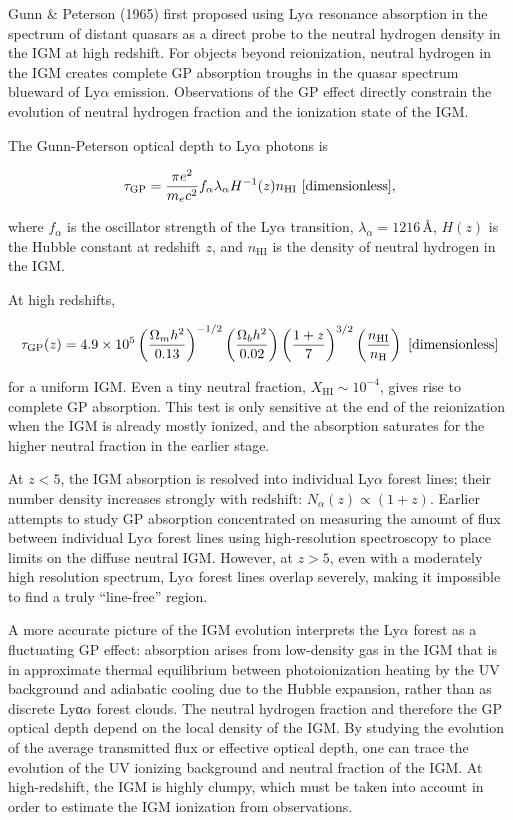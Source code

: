 \documentclass[a4paper,11pt]{article}
\begin{document}
{\noindent}Gunn \& Peterson (1965) first proposed using Ly$\alpha$ resonance absorption in the spectrum of distant quasars as a direct probe to the neutral hydrogen density in the IGM at high redshift. For objects beyond reionization, neutral hydrogen in the IGM creates complete GP absorption troughs in the quasar spectrum blueward of Ly$\alpha$ emission. Observations of the GP effect directly constrain the evolution of neutral hydrogen fraction and the ionization state of the IGM.

{\noindent}The Gunn-Peterson optical depth to Ly$\alpha$ photons is

\begin{align*}
    \tau_\mathrm{GP} = \frac{\pi e^2}{m_ec^2}f_\alpha\lambda_\alpha H^{-1}(z)n_\mathrm{HI} ~ [{\rm dimensionless}],
\end{align*}

{\noindent}where $f_\alpha$ is the oscillator strength of the Ly$\alpha$ transition, $\lambda_\alpha=1216$\,\AA, $H(z)$ is the
Hubble constant at redshift $z$, and $n_\mathrm{HI}$ is the density of neutral hydrogen in the IGM.

{\noindent}At high redshifts,

\begin{align*}
    \tau_\mathrm{GP}(z) = 4.9\times10^5 \left(\frac{\Omega_mh^2}{0.13}\right)^{-1/2} \left(\frac{\Omega_bh^2}{0.02}\right) \left(\frac{1+z}{7}\right)^{3/2} \left(\frac{n_\mathrm{HI}}{n_\mathrm{H}}\right) ~ [{\rm dimensionless}]
\end{align*}

{\noindent}for a uniform IGM. Even a tiny neutral fraction, $X_\mathrm{HI}\sim10^{-4}$, gives rise to complete GP absorption. This test is only sensitive at the end of the reionization when the IGM is already mostly ionized, and the absorption saturates for the higher neutral fraction in the earlier stage.

{\noindent}At $z<5$, the IGM absorption is resolved into individual Ly$\alpha$ forest lines; their number density increases strongly with redshift: $N_\alpha(z)\propto(1+z)$. Earlier attempts to study GP absorption concentrated on measuring the amount of flux between individual Ly$\alpha$ forest lines using high-resolution spectroscopy to place limits on the diffuse neutral IGM. However, at $z>5$, even with a moderately high resolution spectrum, Ly$\alpha$ forest lines overlap severely, making it impossible to find a truly ``line-free'' region.

{\noindent}A more accurate picture of the IGM evolution interprets the Ly$\alpha$ forest as a fluctuating GP effect: absorption arises from low-density gas in the IGM that is in approximate thermal equilibrium between photoionization heating by the UV background and adiabatic cooling due to the Hubble expansion, rather than as discrete Lyα$\alpha$ forest clouds. The neutral hydrogen fraction and therefore the GP optical depth
depend on the local density of the IGM. By studying the evolution of the average transmitted flux or effective optical depth, one can trace the evolution of the UV ionizing background and neutral fraction of the IGM. At high-redshift, the IGM is highly clumpy, which must be taken into account in order to estimate the IGM ionization from observations.
\end{document}
